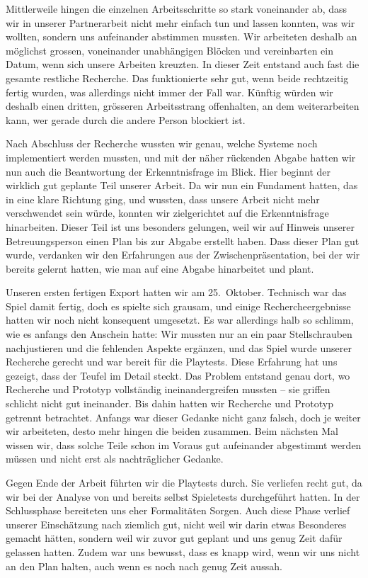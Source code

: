\documentclass[../Main.tex]{subfiles}
\begin{document}
Mittlerweile hingen die einzelnen Arbeitsschritte so stark voneinander ab, dass wir in unserer Partnerarbeit nicht mehr einfach tun und lassen konnten, was wir wollten, sondern uns aufeinander abstimmen mussten. Wir arbeiteten deshalb an möglichst grossen, voneinander unabhängigen Blöcken und vereinbarten ein Datum, wenn sich unsere Arbeiten kreuzten. In dieser Zeit entstand auch fast die gesamte restliche Recherche. Das funktionierte sehr gut, wenn beide rechtzeitig fertig wurden, was allerdings nicht immer der Fall war. Künftig würden wir deshalb einen dritten, grösseren Arbeitsstrang offenhalten, an dem weiterarbeiten kann, wer gerade durch die andere Person blockiert ist.

Nach Abschluss der Recherche wussten wir genau, welche Systeme noch implementiert werden mussten, und mit der näher rückenden Abgabe hatten wir nun auch die Beantwortung der Erkenntnisfrage im Blick. Hier beginnt der wirklich gut geplante Teil unserer Arbeit. Da wir nun ein Fundament hatten, das in eine klare Richtung ging, und wussten, dass unsere Arbeit nicht mehr verschwendet sein würde, konnten wir zielgerichtet auf die Erkenntnisfrage hinarbeiten. Dieser Teil ist uns besonders gelungen, weil wir auf Hinweis unserer Betreuungsperson einen Plan bis zur Abgabe erstellt haben. Dass dieser Plan gut wurde, verdanken wir den Erfahrungen aus der Zwischenpräsentation, bei der wir bereits gelernt hatten, wie man auf eine Abgabe hinarbeitet und plant.

Unseren ersten fertigen Export hatten wir am 25.~Oktober. Technisch war das Spiel damit fertig, doch es spielte sich grausam, und einige Rechercheergebnisse hatten wir noch nicht konsequent umgesetzt. Es war allerdings halb so schlimm, wie es anfangs den Anschein hatte: Wir mussten nur an ein paar Stellschrauben nachjustieren und die fehlenden Aspekte ergänzen, und das Spiel wurde unserer Recherche gerecht und war bereit für die Playtests. Diese Erfahrung hat uns gezeigt, dass der Teufel im Detail steckt. Das Problem entstand genau dort, wo Recherche und Prototyp vollständig ineinandergreifen mussten -- sie griffen schlicht nicht gut ineinander. Bis dahin hatten wir Recherche und Prototyp getrennt betrachtet. Anfangs war dieser Gedanke nicht ganz falsch, doch je weiter wir arbeiteten, desto mehr hingen die beiden zusammen. Beim nächsten Mal wissen wir, dass solche Teile schon im Voraus gut aufeinander abgestimmt werden müssen und nicht erst als nachträglicher Gedanke.

Gegen Ende der Arbeit führten wir die Playtests durch. Sie verliefen recht gut, da wir bei der Analyse von  und  bereits selbst Spieletests durchgeführt hatten. In der Schlussphase bereiteten uns eher Formalitäten Sorgen. Auch diese Phase verlief unserer Einschätzung nach ziemlich gut, nicht weil wir darin etwas Besonderes gemacht hätten, sondern weil wir zuvor gut geplant und uns genug Zeit dafür gelassen hatten. Zudem war uns bewusst, dass es knapp wird, wenn wir uns nicht an den Plan halten, auch wenn es noch nach genug Zeit aussah.
\end{document}

